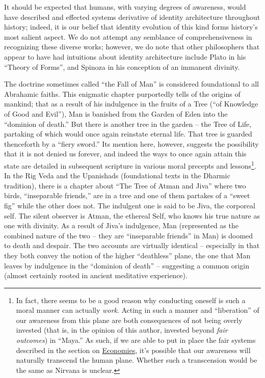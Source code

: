\documentclass[pra,twocolumn,groupedaddress,10pt]{revtex4}
\theoremstyle{definition}
\begin{document}
It should be expected that humans, with varying degrees of awareness, would have described and effected systems derivative of identity architecture throughout history; indeed, it is our belief that identity evolution of this kind forms history's most salient aspect. We do not attempt any semblance of comprehensiveness in recognizing these diverse works; however, we do note that other philosophers that appear to have had intuitions about identity architecture include Plato in his ``Theory of Forms''\cite{plato}, and Spinoza\cite{spinoza} in his conception of an immanent divinity.

The doctrine sometimes called ``the Fall of Man'' is considered foundational to all Abrahamic faiths. This enigmatic chapter purportedly tells of the origins of mankind; that as a result of his indulgence in the fruits of a Tree (``of Knowledge of Good and Evil''), Man is banished from the Garden of Eden into the ``dominion of death.''\cite{genesisfallofman} But there is another tree in the garden -- the Tree of Life, partaking of which would once again reinstate eternal life. That tree is guarded thenceforth by a ``fiery sword.'' Its mention here, however, suggests the possibility that it is not denied us forever, and indeed the ways to once again attain this state are detailed in subsequent scripture in various moral precepts and lessons\footnote{In fact, there seems to be a good reason why conducting oneself is such a moral manner can actually \textit{work}. Acting in such a manner and ``liberation'' of our awareness from this plane are both consequences of not being overly invested (that is, in the opinion of this author, invested beyond \textit{fair outcomes}) in ``Maya.'' As such, if we are able to put in place the fair systems described in the section on \hyperref[sec:ecogovintpro]{Economies}, it's possible that our awareness will naturally transcend the human plane. Whether such a transcension would be the same as Nirvana is unclear.}. In the Rig Veda and the Upanishads (foundational texts in the Dharmic tradition), there is a chapter about ``The Tree of Atman and Jiva''\cite{mundakaupanishad} where two birds, ``inseparable friends,'' are in a tree and one of them partakes of a ``sweet fig'' while the other does not. The indulgent one is said to be Jiva, the corporeal self. The silent observer is Atman, the ethereal Self, who knows his true nature as one with divinity. As a result of Jiva's indulgence, Man (represented as the combined nature of the two -- they are ``inseparable friends'' in Man) is doomed to death and despair. The two accounts are virtually identical -- especially in that they both convey the notion of the higher ``deathless'' plane, the one that Man leaves by indulgence in the ``dominion of death'' -- suggesting a common origin (almost certainly rooted in ancient meditative experience).
\end{document}
